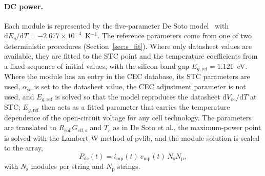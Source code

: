 \documentclass[11pt]{article}
\begin{document}
\paragraph{DC power.}
Each module is represented by the five-parameter De Soto model~\cite{desotoImprovementValidationModel2006} with $\mathrm{d}E_g/\mathrm{d}T=-2.677\times10^{-4}$~K$^{-1}$. The reference parameters come from one of two deterministic procedures (Section~\ref{sec:s_fit}). Where only datasheet values are available, they are fitted to the STC point and the temperature coefficients from a fixed sequence of initial values, with the silicon band gap $E_{g,\mathrm{ref}}=1.121$~eV. Where the module has an entry in the CEC database, its STC parameters are used, $\alpha_{\mathrm{sc}}$ is set to the datasheet value, the CEC adjustment parameter is not used, and $E_{g,\mathrm{ref}}$ is solved so that the model reproduces the datasheet $\mathrm{d}V_{\mathrm{oc}}/\mathrm{d}T$ at STC; $E_{g,\mathrm{ref}}$ then acts as a fitted parameter that carries the temperature dependence of the open-circuit voltage for any cell technology. The parameters are translated to $R_{\mathrm{soil}}G_{\mathrm{eff,s}}$ and $T_c$ as in De Soto et al., the maximum-power point is solved with the Lambert-W method of pvlib, and the module solution is scaled to the array,
\begin{equation}
P_{\mathrm{dc}}(t)=i_{\mathrm{mp}}(t)\,v_{\mathrm{mp}}(t)\,N_{\mathrm{s}}N_{\mathrm{p}},
\label{eq:pdc}
\end{equation}
with $N_{\mathrm{s}}$ modules per string and $N_{\mathrm{p}}$ strings.
\end{document}
